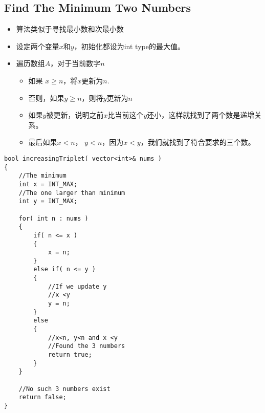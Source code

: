 \subsection{Find The Minimum Two Numbers}
\begin{itemize}
\item 算法类似于寻找最小数和次最小数
\item 设定两个变量$ x $和$ y $，初始化都设为int type的最大值。
\item 遍历数组$A$，对于当前数字$ n $
\begin{itemize}
\item 如果 $ x\geq n $，将$ x $更新为$n$. 
\item 否则，如果$ y\geq n $，则将$ y $更新为$n$
\item 如果$y$被更新，说明之前$x$比当前这个$y$还小，这样就找到了两个数是递增关系。
\item 最后如果$x<n$， $y<n$，因为$x<y$，我们就找到了符合要求的三个数。
\end{itemize}
\end{itemize}
\setcounter{lstlisting}{0}
\begin{lstlisting}[style=customc, caption={Find Minimum}]
bool increasingTriplet( vector<int>& nums )
{
    //The minimum
    int x = INT_MAX;
    //The one larger than minimum
    int y = INT_MAX;

    for( int n : nums )
    {
        if( n <= x )
        {
            x = n;
        }
        else if( n <= y )
        {
            //If we update y
            //x <y
            y = n;
        }
        else
        {
            //x<n, y<n and x <y
            //Found the 3 numbers
            return true;
        }
    }

    //No such 3 numbers exist
    return false;
}
\end{lstlisting}



